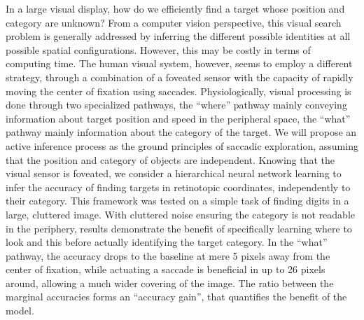 In a large visual display, how do we efficiently find a target whose position and category are unknown? From a computer vision perspective, this visual search problem is generally addressed by inferring the different possible identities at all possible spatial configurations. However, this may be costly in terms of computing time. The human visual system, however, seems to employ a different strategy, through a combination of a foveated sensor with the capacity of rapidly moving the center of fixation using saccades. Physiologically, visual processing is done through two specialized pathways, the ``where'' pathway mainly conveying information about target position and speed in the peripheral space, the ``what'' pathway mainly information about the category of the target. We will propose an active inference process as the ground principles of saccadic exploration, assuming that the position and category of objects are independent. Knowing that the visual sensor is foveated, we consider a hierarchical neural network learning to infer the accuracy of finding targets in retinotopic coordinates, independently to their category. This framework was tested on a simple task of finding digits in a large, cluttered image. With cluttered noise ensuring the category is not readable in the periphery, results demonstrate the benefit of specifically learning where to look and this before actually identifying the target category. In the ``what'' pathway, the accuracy drops to the baseline at mere 5 pixels away from the center of fixation, while actuating a saccade is beneficial in up to 26 pixels around, allowing a much wider covering of the image. The ratio between the marginal accuracies forms an ``accuracy gain'', that quantifies the benefit of the model. %
